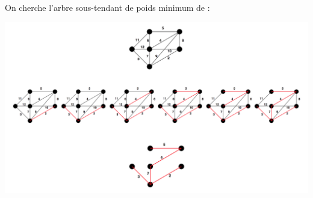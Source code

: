 \begin{myexem}
  On cherche l’arbre sous-tendant de poids minimum de :
  \begin{center}
    \includegraphics[width=400pt]{../img/kruskal}
  \end{center}
\end{myexem}

